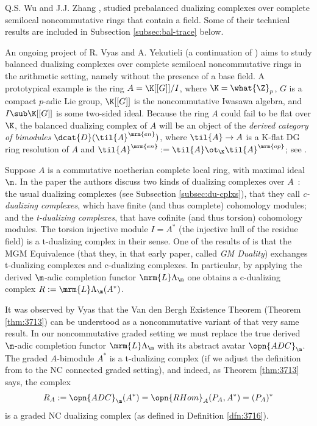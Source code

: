 \begin{rem} \label{rem:4082}
Q.S. Wu and J.J. Zhang \cite{WuZh}, \cite{WuZh2} studied prebalanced dualizing 
complexes over complete semilocal noncommutative rings that contain a field. 
Some of their technical results are included in Subsection 
\ref{subsec:bal-trace} below. 

An ongoing project of R. Vyas and A. Yekutieli (a continuation of \cite{VyYe}) 
aims to study balanced dualizing complexes over complete semilocal 
noncommutative rings in the arithmetic setting, namely without the presence of 
a base field. A prototypical example is the ring 
$A = \K[[G]] / I$, where $\K = \what{\Z}_p$, $G$ is a compact $p$-adic Lie 
group, $\K[[G]]$ is the noncommutative Iwasawa algebra, and 
$I \sub \K[[G]]$ is some two-sided ideal.  Because the ring $A$ could fail to 
be flat over $\K$, the balanced dualizing complex of $A$ will be an object of 
the {\em derived category of bimodules} 
$\dcat{D}(\til{A}^{\mrm{en}})$, where 
$\til{A} \to A$ is a K-flat DG ring resolution of $A$ and 
$\til{A}^{\mrm{en}} := \til{A} \ot_{\K} \til{A}^{\mrm{op}}$;
see \cite{Ye16}. 
\end{rem}

\begin{rem} \label{rem:4081}
Suppose $A$ is a commutative noetherian complete local ring, with maximal ideal 
$\m$. In the paper \cite{AlJeLi} the authors discuss two kinds of dualizing 
complexes over $A$~: the usual dualizing complexes (see Subsection 
\ref{subsec:du-cplxs}), 
that they call {\em c-dualizing complexes}, which have finite (and thus 
complete) cohomology modules; and the {\em t-dualizing complexes}, 
that have cofinite (and thus torsion) cohomology modules.
The torsion injective module $I = A^*$ (the injective hull of the residue 
field) is a t-dualizing complex in their sense. One of the results of 
\cite{AlJeLi} is that the MGM Equivalence (that they, in that early paper, 
called {\em GM Duality}) exchanges t-dualizing complexes and c-dualizing 
complexes. In particular, by applying the derived $\m$-adic completion functor 
$\mrm{L} \Lambda_{\m}$ one obtains a c-dualizing complex 
$R := \mrm{L} \Lambda_{\m}(A^*)$. 

It was observed by Vyas that the Van den Bergh Existence Theorem (Theorem 
\ref{thm:3713}) can be understood as a noncommutative variant of that very same 
result. In our noncommutative graded setting we must replace the true derived 
$\m$-adic completion functor $\mrm{L} \Lambda_{\m}$ with its abstract 
avatar $\opn{ADC}_{\m}$. The graded $A$-bimodule $A^*$ is a t-dualizing complex 
(if we adjust the definition from \cite{AlJeLi} to the NC connected graded 
setting), and indeed, as Theorem \ref{thm:3713} says, the complex
\[ R_A := \opn{ADC}_{\m}(A^*) = \opn{RHom}_{A}(P_A, A^*) = (P_A)^* \]
is a graded NC dualizing complex (as defined in Definition \ref{dfn:3716}).
\end{rem}




